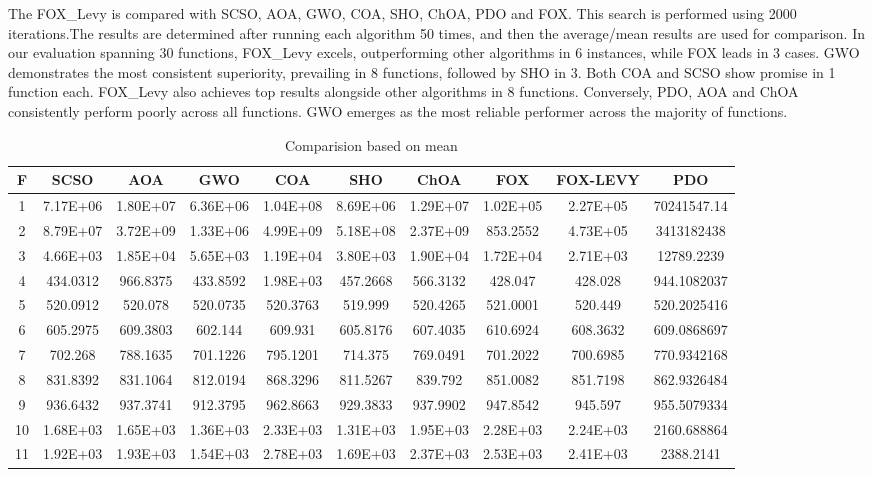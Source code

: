\documentclass[
]{article}
\begin{document}
\begin{justify}
{  The FOX\_Levy is compared with SCSO, AOA, GWO, COA, SHO, ChOA, PDO and FOX.
This search is performed using 2000 iterations.The results are determined after running each algorithm 50 times, and then the average/mean results are used for comparison. In our evaluation spanning 30 functions, FOX\_Levy excels, outperforming other algorithms in 6 instances, while FOX leads in 3 cases. GWO demonstrates the most consistent superiority, prevailing in 8 functions, followed by SHO in 3. Both COA and SCSO show promise in 1 function each. FOX\_Levy also achieves top results alongside other algorithms in 8 functions. Conversely, PDO, AOA and ChOA consistently perform poorly across all functions. GWO emerges as the most reliable performer across the majority of functions.

\begin{table}[h!]
\caption{Comparision based on mean}
\scriptsize %
\begin{tabular}{||c c c c c c c c c c||}
\hline
F & SCSO  & AOA & GWO & COA & SHO & ChOA & FOX & FOX-LEVY & PDO\\ [1ex]
\hline\hline
1 & 7.17E+06 & 1.80E+07 & 6.36E+06 & 1.04E+08& 8.69E+06& 1.29E+07& 1.02E+05& 2.27E+05 &70241547.14\\ 
2 & 8.79E+07 & 3.72E+09 & 1.33E+06 & 4.99E+09& 5.18E+08& 2.37E+09& 853.2552& 4.73E+05 &3413182438\\ 
3 & 4.66E+03 & 1.85E+04 & 5.65E+03 & 1.19E+04& 3.80E+03& 1.90E+04& 1.72E+04& 2.71E+03 & 12789.2239 \\ 
4 & 434.0312 & 966.8375 & 433.8592 & 1.98E+03& 457.2668& 566.3132& 428.047& 428.028 & 944.1082037 \\
5 & 520.0912 & 520.078 & 520.0735 & 520.3763& 519.999& 520.4265& 521.0001& 520.449 & 520.2025416 \\
6 & 605.2975 & 609.3803 & 602.144 & 609.931& 605.8176& 607.4035& 610.6924& 608.3632 & 609.0868697\\
7 & 702.268 & 788.1635 & 701.1226& 795.1201& 714.375& 769.0491& 701.2022& 700.6985& 770.9342168\\
8 & 831.8392 & 831.1064 & 812.0194& 868.3296& 811.5267& 839.792& 851.0082& 851.7198 & 862.9326484\\
9 & 936.6432 & 937.3741 & 912.3795 & 962.8663& 929.3833& 937.9902& 947.8542& 945.597 &955.5079334\\
10 & 1.68E+03 & 1.65E+03 & 1.36E+03& 2.33E+03& 1.31E+03& 1.95E+03& 2.28E+03& 2.24E+03&2160.688864 \\ 
11 & 1.92E+03 & 1.93E+03 & 1.54E+03& 2.78E+03& 1.69E+03& 2.37E+03& 2.53E+03& 2.41E+03&2388.2141\\ 

\end{tabular}
\end{table}}
\end{justify}
\end{document}
